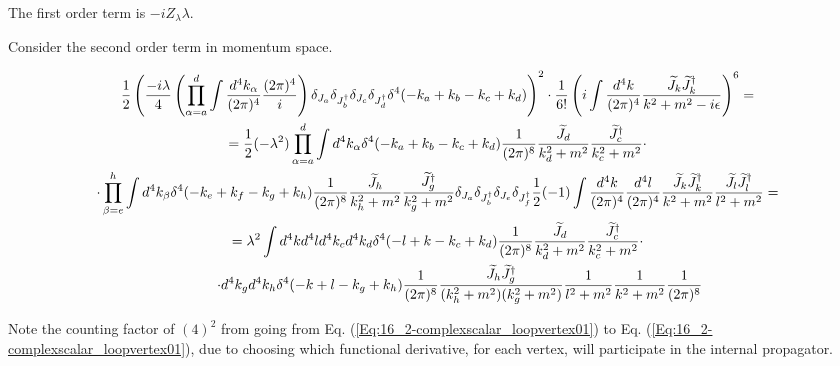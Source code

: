 \documentclass[twoside]{amsart}
\begin{document}
The first order term is $-i Z_{\lambda} \lambda$.  

Consider the second order term in momentum space.  

\begin{gather}
  \frac{1}{2} \left( \frac{ -i  \lambda}{4} \left( \prod_{\alpha= a }^d \int \frac{ d^4k_{\alpha}}{ (2\pi)^4} \frac{ (2\pi)^4}{i } \right) \delta_{J_a} \delta_{J_b^{\dag}} \delta_{J_c} \delta_{J_d^{\dag} } \delta^4(-k_a + k_b - k_c + k_d) \right)^2 \cdot \frac{1}{6!} \left( i \int \frac{d^4k}{ (2\pi)^4} \frac{ \widetilde{J}_k \widetilde{J}_k^{\dag} }{ k^2 + m^2 - i \epsilon } \right)^6 = \label{Eq:16_2-complexscalar_loopvertex01} \\ 
   \begin{gathered} = \frac{1}{2} ( - \lambda^2 ) \prod_{\alpha = a}^d \int  d^4k_{\alpha} \delta^4(-k_a+k_b  - k_c + k_d)  \frac{1}{ (2\pi)^8 } \frac{ \widetilde{J}_{ d} }{ k_d^2 + m^2 } \frac{ \widetilde{J}_{ c}^{\dag} }{ k_c^2 + m^2 } \cdot \\ 
 \cdot     \prod_{\beta = e}^h \int d^4k_{\beta} \delta^4( - k_e + k_f - k_g + k_h ) \frac{1}{(2\pi)^ 8 } \frac{ \widetilde{J}_h}{ k_h^2 + m^2 } \frac{ \widetilde{J}_g^{\dag}}{ k_g^2 + m^2 }  \delta_{J_a} \delta_{J_b^{\dag}} \delta_{J_e } \delta_{J_f^{\dag}} \frac{1}{2} (-1) \int \frac{ d^4k}{ (2\pi)^4} \frac{ d^4l}{ (2\pi)^4} \frac{ \widetilde{J}_k \widetilde{J}_k^{\dag}}{ k^2 + m^2 }  \frac{ \widetilde{J}_l \widetilde{J}_l^{\dag}}{ l^2 + m^2 }   = \end{gathered} \label{Eq:16_2-complexscalar_loopvertex02} \\
   \begin{gathered} = \lambda^2  \int d^4k d^4l d^4k_c d^4k_d \delta^4(-l + k - k_c + k_d) \frac{1}{(2\pi)^8} \frac{ \widetilde{J}_d}{ k_d^2 + m^2 } \frac{ \widetilde{J}_c^{\dag}}{ k_c^2 + m^2 } \cdot \\ 
     \quad \quad \quad \,      \cdot d^4k_g d^4k_h \delta^4(-k + l - k_g + k_h ) \frac{1}{ (2\pi)^8 } \frac{ \widetilde{J}_h \widetilde{J}_g^{\dag}}{ (k_h^2 + m^2 )(k_g^2 + m^2 ) } \frac{1}{ l^2 + m^2 } \frac{1}{ k^2 + m^2 } \frac{ 1 }{ (2\pi)^8 } \end{gathered} \notag
\end{gather}

Note the counting factor of $(4)^2$ from going from Eq. (\ref{Eq:16_2-complexscalar_loopvertex01}) to Eq. (\ref{Eq:16_2-complexscalar_loopvertex01}), due to choosing which functional derivative, for each vertex, will participate in the internal propagator.  
\end{document}
